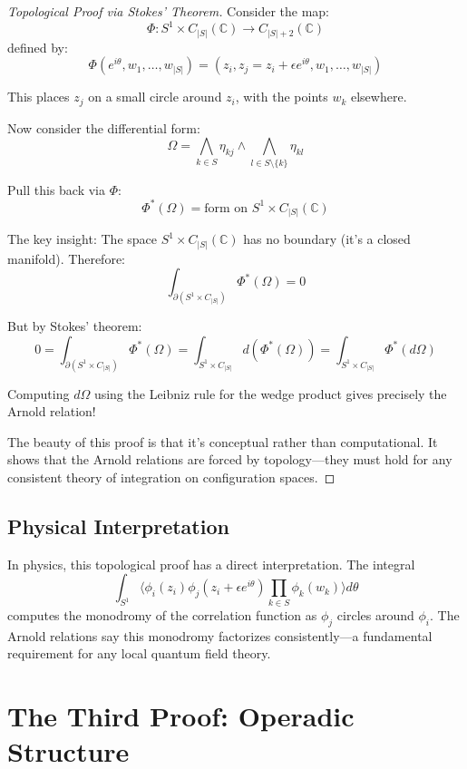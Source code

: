 \begin{proof}[Topological Proof via Stokes' Theorem]

Consider the map:
$$\Phi: S^1 \times C_{|S|}(\mathbb{C}) \to C_{|S|+2}(\mathbb{C})$$
defined by:
$$\Phi(e^{i\theta}, w_1, \ldots, w_{|S|}) = (z_i, z_j = z_i + \epsilon e^{i\theta}, w_1, \ldots, w_{|S|})$$

This places $z_j$ on a small circle around $z_i$, with the points $w_k$ elsewhere.

Now consider the differential form:
$$\Omega = \bigwedge_{k \in S} \eta_{kj} \wedge \bigwedge_{l \in S\setminus\{k\}} \eta_{kl}$$

Pull this back via $\Phi$:
$$\Phi^*(\Omega) = \text{form on } S^1 \times C_{|S|}(\mathbb{C})$$

The key insight: The space $S^1 \times C_{|S|}(\mathbb{C})$ has no boundary (it's a closed manifold). Therefore:
$$\int_{\partial(S^1 \times C_{|S|})} \Phi^*(\Omega) = 0$$

But by Stokes' theorem:
$$0 = \int_{\partial(S^1 \times C_{|S|})} \Phi^*(\Omega) = \int_{S^1 \times C_{|S|}} d(\Phi^*(\Omega)) = \int_{S^1 \times C_{|S|}} \Phi^*(d\Omega)$$

Computing $d\Omega$ using the Leibniz rule for the wedge product gives precisely the Arnold relation!

The beauty of this proof is that it's conceptual rather than computational. It shows that the Arnold relations are forced by topology—they must hold for any consistent theory of integration on configuration spaces.
\end{proof}

\subsection{Physical Interpretation}

In physics, this topological proof has a direct interpretation. The integral
$$\int_{S^1} \langle \phi_i(z_i) \phi_j(z_i + \epsilon e^{i\theta}) \prod_{k \in S} \phi_k(w_k) \rangle d\theta$$
computes the monodromy of the correlation function as $\phi_j$ circles around $\phi_i$. The Arnold relations say this monodromy factorizes consistently—a fundamental requirement for any local quantum field theory.

\section{The Third Proof: Operadic Structure}

